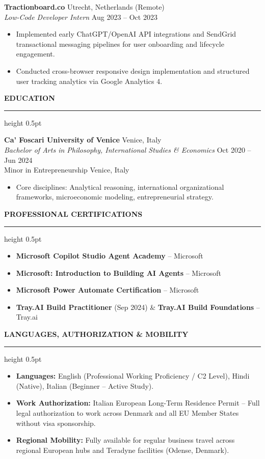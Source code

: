 \documentclass[10pt, a4paper]{article}
\newcommand{\cvsection}[1]{%
  \vspace{6pt}%
  {\normalsize\bfseries\MakeUppercase{#1}}%
  \vspace{2pt}%
  \hrule height 0.5pt%
  \vspace{4pt}%
}
\begin{document}
\vspace{3pt}
\textbf{Tractionboard.co} \hfill Utrecht, Netherlands (Remote)\\
\textit{Low-Code Developer Intern} \hfill Aug 2023 -- Oct 2023
\begin{itemize}
  \item Implemented early ChatGPT/OpenAI API integrations and SendGrid transactional messaging pipelines for user onboarding and lifecycle engagement.
  \item Conducted cross-browser responsive design implementation and structured user tracking analytics via Google Analytics 4.
\end{itemize}

\cvsection{Education}
\textbf{Ca' Foscari University of Venice} \hfill Venice, Italy\\
\textit{Bachelor of Arts in Philosophy, International Studies \& Economics} \hfill Oct 2020 -- Jun 2024\\
Minor in Entrepreneurship \hfill Venice, Italy
\begin{itemize}
  \item Core disciplines: Analytical reasoning, international organizational frameworks, microeconomic modeling, entrepreneurial strategy.
\end{itemize}

\cvsection{Professional Certifications}
\begin{itemize}
  \item \textbf{Microsoft Copilot Studio Agent Academy} -- Microsoft
  \item \textbf{Microsoft: Introduction to Building AI Agents} -- Microsoft
  \item \textbf{Microsoft Power Automate Certification} -- Microsoft
  \item \textbf{Tray.AI Build Practitioner} (Sep 2024) \& \textbf{Tray.AI Build Foundations} -- Tray.ai
\end{itemize}

\cvsection{Languages, Authorization \& Mobility}
\begin{itemize}
  \item \textbf{Languages:} English (Professional Working Proficiency / C2 Level), Hindi (Native), Italian (Beginner -- Active Study).
  \item \textbf{Work Authorization:} Italian European Long-Term Residence Permit -- Full legal authorization to work across Denmark and all EU Member States without visa sponsorship.
  \item \textbf{Regional Mobility:} Fully available for regular business travel across regional European hubs and Teradyne facilities (Odense, Denmark).
\end{itemize}
\end{document}
